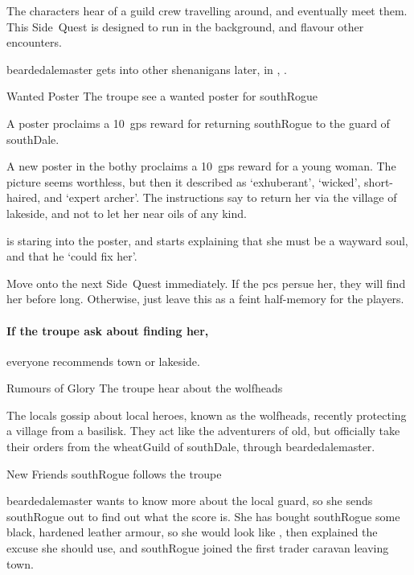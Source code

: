 \label{wolfHeads}

\noindent
The characters hear of a guild crew travelling around, and eventually meet them.
This Side~Quest is designed to run in the background, and flavour other encounters.

\Gls{beardedalemaster} gets into other shenanigans later, in , .

{\squash Wanted Poster}%
{The troupe see a wanted poster for \gls{southRogue}}%

A poster proclaims a 10~\glspl{gp} reward for returning \gls{southRogue} to the \gls{guard} of \gls{southDale}.

\begin{boxtext}
  A new poster in the \gls{bothy} proclaims a 10~\glspl{gp} reward for a young woman.
  The picture seems worthless, but then it described as `exhuberant', `wicked', short-haired, and `expert archer'.
  The instructions say to return her via the \gls{village} of \gls{lakeside}, and not to let her near oils of any kind.

   is staring into the poster, and starts explaining that she must be a wayward soul, and that he `could fix her'.
\end{boxtext}

Move onto the next Side~Quest immediately.
If the \glspl{pc} persue her, they will find her before long.
Otherwise, just leave this as a feint half-memory for the players.

\paragraph{If the troupe ask about finding her,}
everyone recommends \gls{town} or \gls{lakeside}.

{\squash Rumours of Glory}%
{The troupe hear about the \glspl{wolfhead}}%

The locals gossip about local heroes, known as the \glspl{wolfhead}, recently protecting a \gls{village} from a basilisk.
They act like the adventurers of old, but officially take their orders from the \gls{wheatGuild} of \gls{southDale}, through \gls{beardedalemaster}.

{New Friends}%
{\Gls{southRogue} follows the troupe}%

\Gls{beardedalemaster} wants to know more about the local \gls{guard}, so she sends \gls{southRogue} out to find out what the score is.
She has bought \gls{southRogue} some black, hardened leather armour, so she would look like , then explained the excuse she should use, and \gls{southRogue} joined the first trader caravan leaving \gls{town}.

